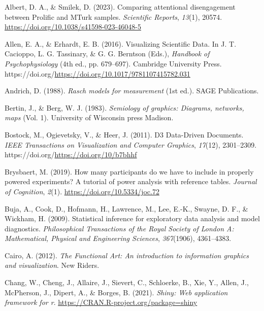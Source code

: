 \documentclass[
  10pt,
]{article}
\newlength{\cslhangindent}
\newenvironment{CSLReferences}[2] %
 {\begin{list}{}{%
  \setlength{\itemindent}{0pt}
  \setlength{\leftmargin}{0pt}
  \setlength{\parsep}{0pt}
  \ifodd #1
   \setlength{\leftmargin}{\cslhangindent}
   \setlength{\itemindent}{-1\cslhangindent}
  \fi
  \setlength{\itemsep}{#2\baselineskip}}}
 {\end{list}}
\begin{document}
\label{refs}
\begin{CSLReferences}{1}{0}
Albert, D. A., \& Smilek, D. (2023). Comparing attentional disengagement
between {Prolific} and {MTurk} samples. \emph{Scientific Reports},
\emph{13}(1), 20574. \url{https://doi.org/10.1038/s41598-023-46048-5}

Allen, E. A., \& Erhardt, E. B. (2016). Visualizing {Scientific} {Data}.
In J. T. Cacioppo, L. G. Tassinary, \& G. G. Berntson (Eds.),
\emph{Handbook of {Psychophysiology}} (4th ed., pp. 679--697). Cambridge
University Press.
https://doi.org/\url{https://doi.org/10.1017/9781107415782.031}

Andrich, D. (1988). \emph{Rasch models for measurement} (1st ed.).
{SAGE} Publications.

Bertin, J., \& Berg, W. J. (1983). \emph{Semiology of graphics:
Diagrams, networks, maps} (Vol. 1). University of Wisconsin press
Madison.

Bostock, M., Ogievetsky, V., \& Heer, J. (2011). D3 {Data}-{Driven}
{Documents}. \emph{IEEE Transactions on Visualization and Computer
Graphics}, \emph{17}(12), 2301--2309.
https://doi.org/\url{https://doi.org/10/b7bhhf}

Brysbaert, M. (2019). How many participants do we have to include in
properly powered experiments? {A} tutorial of power analysis with
reference tables. \emph{Journal of Cognition}, \emph{2}(1).
\url{https://doi.org/10.5334/joc.72}

Buja, A., Cook, D., Hofmann, H., Lawrence, M., Lee, E.-K., Swayne, D.
F., \& Wickham, H. (2009). Statistical inference for exploratory data
analysis and model diagnostics. \emph{Philosophical Transactions of the
Royal Society of London A: Mathematical, Physical and Engineering
Sciences}, \emph{367}(1906), 4361--4383.

Cairo, A. (2012). \emph{The {Functional} {Art}: {An} introduction to
information graphics and visualization}. New Riders.

Chang, W., Cheng, J., Allaire, J., Sievert, C., Schloerke, B., Xie, Y.,
Allen, J., McPherson, J., Dipert, A., \& Borges, B. (2021). \emph{Shiny:
Web application framework for r}.
\url{https://CRAN.R-project.org/package=shiny}


\end{CSLReferences}
\end{document}
